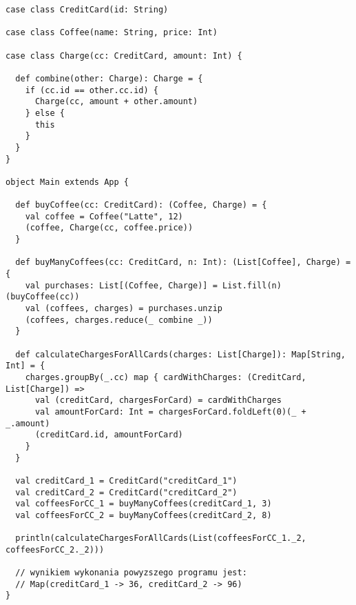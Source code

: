 \documentclass[../main.tex]{subfiles}
\begin{document}
\begin{lstlisting}[caption=Fragment kodu ponownie wykorzystujący funkcję przerestrukturyzowaną w zgodzie z paradygmatem funkcyjnym. Na podstawie \cite{BOOK:FPinScala}]
case class CreditCard(id: String)

case class Coffee(name: String, price: Int)

case class Charge(cc: CreditCard, amount: Int) {

  def combine(other: Charge): Charge = {
    if (cc.id == other.cc.id) {
      Charge(cc, amount + other.amount)
    } else {
      this
    }
  }
}

object Main extends App {

  def buyCoffee(cc: CreditCard): (Coffee, Charge) = {
    val coffee = Coffee("Latte", 12)
    (coffee, Charge(cc, coffee.price))
  }

  def buyManyCoffees(cc: CreditCard, n: Int): (List[Coffee], Charge) = {
    val purchases: List[(Coffee, Charge)] = List.fill(n)(buyCoffee(cc))
    val (coffees, charges) = purchases.unzip
    (coffees, charges.reduce(_ combine _))
  }

  def calculateChargesForAllCards(charges: List[Charge]): Map[String, Int] = {
    charges.groupBy(_.cc) map { cardWithCharges: (CreditCard, List[Charge]) =>
      val (creditCard, chargesForCard) = cardWithCharges
      val amountForCard: Int = chargesForCard.foldLeft(0)(_ + _.amount)
      (creditCard.id, amountForCard)
    }
  }

  val creditCard_1 = CreditCard("creditCard_1")
  val creditCard_2 = CreditCard("creditCard_2")
  val coffeesForCC_1 = buyManyCoffees(creditCard_1, 3)
  val coffeesForCC_2 = buyManyCoffees(creditCard_2, 8)

  println(calculateChargesForAllCards(List(coffeesForCC_1._2, coffeesForCC_2._2)))
  
  // wynikiem wykonania powyzszego programu jest:
  // Map(creditCard_1 -> 36, creditCard_2 -> 96)
}

\end{lstlisting}
\end{document}
